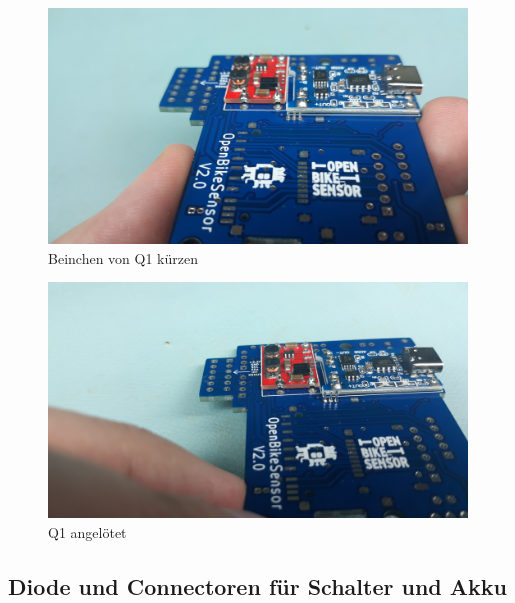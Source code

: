 \documentclass[12pt, a4paper]{article}		%
\begin{document}
\begin{minipage}[t]{0.49\textwidth}
\begin{figure}[H]
	\centering
		\includegraphics[width=0.99\textwidth]{Grafiken/20200726_124729.jpg}
	\caption{Beinchen von Q1 kürzen}
	\label{fig:}
\end{figure}
\end{minipage}
\begin{minipage}[t]{0.49\textwidth}
\begin{figure}[H]
	\centering
		\includegraphics[width=0.99\textwidth]{Grafiken/20200726_124826.jpg}
	\caption{Q1 angelötet}
	\label{fig:}
\end{figure}
\end{minipage}

\subsection{Diode und Connectoren für Schalter und Akku}
\end{document}

